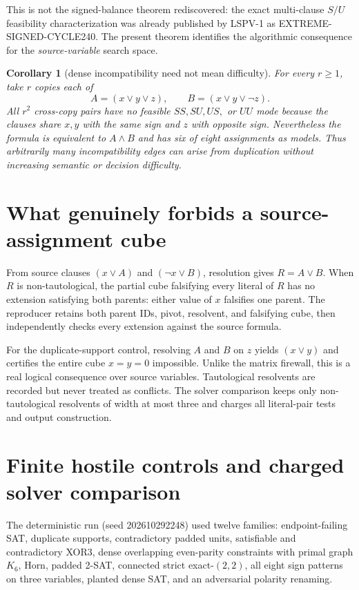 \documentclass[10pt]{article}
\newtheorem{corollary}{Corollary}
\begin{document}
This is not the signed-balance theorem rediscovered: the exact multi-clause
$S/U$ feasibility characterization was already published by LSPV-1 as
EXTREME-SIGNED-CYCLE240.  The present theorem identifies the algorithmic consequence
for the \emph{source-variable} search space.

\begin{corollary}[dense incompatibility need not mean difficulty]
For every $r\ge1$, take $r$ copies each of
\[
 A=(x\vee y\vee z),\qquad B=(x\vee y\vee\neg z).
\]
All $r^2$ cross-copy pairs have no feasible $SS,SU,US,$ or $UU$ mode because the
clauses share $x,y$ with the same sign and $z$ with opposite sign.  Nevertheless the
formula is equivalent to $A\wedge B$ and has six of eight assignments as models.
Thus arbitrarily many incompatibility edges can arise from duplication without
increasing semantic or decision difficulty.
\end{corollary}

\section{What genuinely forbids a source-assignment cube}

From source clauses $(x\vee A)$ and $(\neg x\vee B)$, resolution gives
$R=A\vee B$.  When $R$ is non-tautological, the partial cube falsifying every literal
of $R$ has no extension satisfying both parents: either value of $x$ falsifies one
parent.  The reproducer retains both parent IDs, pivot, resolvent, and falsifying cube,
then independently checks every extension against the source formula.

For the duplicate-support control, resolving $A$ and $B$ on $z$ yields
$(x\vee y)$ and certifies the entire cube $x=y=0$ impossible.  Unlike the matrix
firewall, this is a real logical consequence over source variables.  Tautological
resolvents are recorded but never treated as conflicts.  The solver comparison keeps
only non-tautological resolvents of width at most three and charges all literal-pair
tests and output construction.

\section{Finite hostile controls and charged solver comparison}

The deterministic run (seed 202610292248) used twelve families: endpoint-failing
SAT, duplicate supports, contradictory padded units, satisfiable and contradictory
XOR3, dense overlapping even-parity constraints with primal graph $K_6$, Horn,
padded 2-SAT, connected strict exact-$(2,2)$, all eight sign patterns on three
variables, planted dense SAT, and an adversarial polarity renaming.
\end{document}
